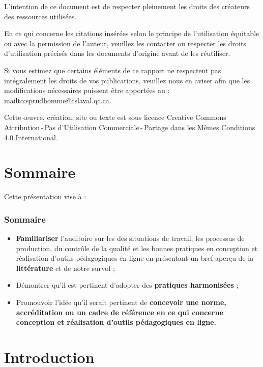 	
	
	\frame{\titlepage} 
	\usebackgroundtemplate{ } 
	\par L’intention de ce document est de respecter pleinement les droits des créateurs des ressources
utilisées.
	\par En ce qui concerne les citations insérées selon le principe de l'utilisation équitable ou avec la permission de l'auteur, veuillez les contacter ou respecter les droits d’utilisation précisés dans les documents d’origine avant de les réutiliser.
	\par Si vous estimez que certains éléments de ce rapport ne respectent pas intégralement les droits de vos
publications, veuillez nous en aviser afin que les modifications nécessaires puissent être apportées au : \url{mailto:sprudhomme@cslaval.qc.ca}.
	\par Cette \oe uvre, création, site ou texte est sous licence Creative Commons Attribution\,-\,Pas d’Utilisation Commerciale\,-\,Partage dans les Mêmes Conditions 4.0 International.
	\section{Sommaire} 
		\begin{frame}
			Cette présentation vise à :
			\frametitle{Sommaire}
			\begin {itemize}
				\item \textbf{Familiariser} l'auditoire sur les des situations de travail, les processus de production, 
du contrôle de la qualité et  les  bonnes pratiques en conception et réalisation d’outils pédagogiques en ligne en présentant un bref aperçu de la \textbf{littérature} et de notre survol ;
				\item Démontrer qu'il est pertinent d'adopter des \textbf{pratiques harmonisées} ;
				\item Promouvoir l'idée qu'il serait pertinent de \textbf{concevoir une norme, accréditation ou un cadre de référence en ce qui concerne conception et réalisation d’outils pédagogiques en ligne.}

			\end{itemize}
		\end{frame}


	\section{Introduction} 
		
